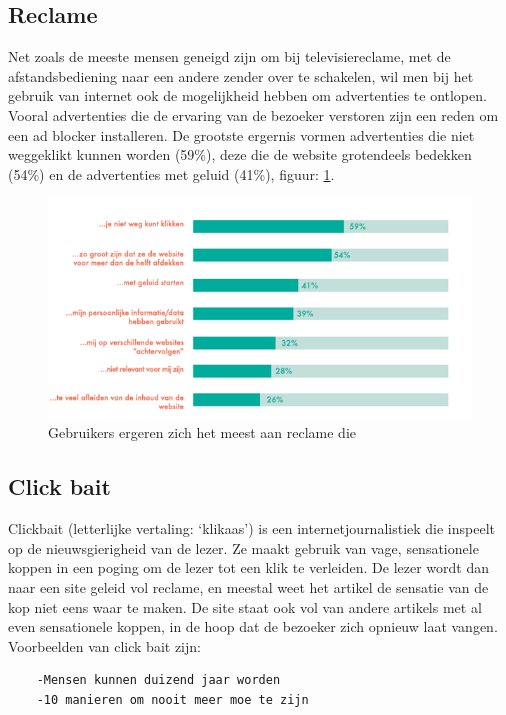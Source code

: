 \documentclass[pdftex,a4paper,12pt,twoside]{report}
\begin{document}
\subsection{Reclame}
\label{sec Reclame}
Net zoals de meeste mensen geneigd zijn om bij televisiereclame, met de afstandsbediening naar een andere zender over te schakelen, wil men bij het gebruik van internet ook de mogelijkheid hebben om advertenties te ontlopen. Vooral advertenties die de ervaring van de bezoeker verstoren zijn een reden om een ad blocker installeren. De grootste ergernis vormen advertenties die niet weggeklikt kunnen worden (59\%), deze die de website grotendeels bedekken (54\%) en de advertenties met geluid (41\%), figuur: \ref{fig: Redenadblockreclame}.
\begin{figure}[h!]
\centering
\includegraphics[width=12cm]{img/Redenadblockreclame}
\caption{Gebruikers ergeren zich het meest aan reclame die}
\label{fig: Redenadblockreclame}
\end{figure}

\subsection{Click bait}
\label{sec click bait}
Clickbait (letterlijke vertaling: ‘klikaas’) is een internetjournalistiek die inspeelt op de nieuwsgierigheid van de lezer. Ze maakt gebruik van vage, sensationele koppen in een poging om de lezer tot een klik te verleiden. De lezer wordt dan naar een site geleid vol reclame, en meestal weet het artikel de sensatie van de kop niet eens waar te maken. De site staat ook vol van andere artikels met al even sensationele koppen, in de hoop dat de bezoeker zich opnieuw laat vangen.
\\
Voorbeelden van click bait zijn:
\begin{lstlisting}
	-Mensen kunnen duizend jaar worden
	-10 manieren om nooit meer moe te zijn
\end{lstlisting}
\end{document}

